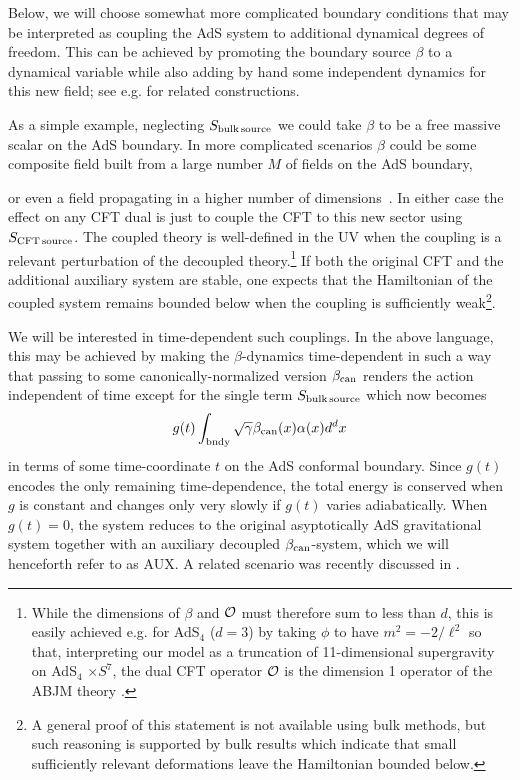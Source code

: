 \documentclass[12pt]{article}
\newcommand{\be}{\begin{equation}}
\newcommand{\ee}{\end{equation}}
\begin{document}
Below, we will choose somewhat more complicated boundary conditions that may be interpreted as coupling the AdS system to additional dynamical degrees of freedom.  This can be achieved by promoting the boundary source {$\beta$} %
to a dynamical variable while also adding by hand some independent dynamics for this new field; {see e.g.\cite{Witten:2003ya,Rocha:2008fe,Compere:2008us,Domenech:2010nf,Faulkner:2010tq,Andrade:2011dg} for related constructions}.

As a simple example, neglecting $S_{\rm bulk \,source}$ we could take $\beta$ to be a free massive scalar on the AdS boundary.  In more complicated scenarios $\beta$ could be some composite field built from a large number $M$ of fields on the AdS boundary, {or even a field propagating in a higher number of dimensions~\cite{Rocha:2008fe}.  In either case the effect on any CFT dual is just to couple the CFT to this new sector using $S_{\rm CFT \, source}$.  The coupled theory is well-defined in the UV when the coupling is a relevant perturbation of the decoupled theory.\footnote{While the dimensions of $\beta$  and ${\cal O}$ must therefore sum to less than $d$,   this is easily achieved e.g. for AdS${}_4$ ($d=3$) by taking $\phi$ to have $m^2 = -2/\ell^2$
 so that, interpreting our model as a truncation of 11-dimensional supergravity on AdS${}_4$ $\times S^7$, the dual CFT operator ${\cal O}$ is the dimension 1 operator of the ABJM theory \cite{Aharony:2008ug}.}  If both the original CFT and the additional auxiliary system are stable, one expects that the Hamiltonian of the coupled system remains bounded below when the coupling is sufficiently weak\footnote{A general proof of this statement is not available using bulk methods, but such reasoning is supported by bulk results \cite{positive} which indicate that small sufficiently relevant deformations leave the Hamiltonian bounded below.}.

We will be interested in time-dependent such couplings.  In the above language, this may be achieved by making the $\beta$-dynamics time-dependent in such a way that passing to some canonically-normalized version {$\beta_{\rm can}$} renders the action independent of time except for the single term $S_{\rm bulk \, source}$ which now becomes
\be
g(t) \int_{\rm bndy} \sqrt{\gamma} \beta_{\rm can}(x) \alpha(x) d^dx
\ee
 in terms of some time-coordinate $t$ on the AdS conformal boundary. Since $g(t)$ encodes the only remaining time-dependence, the total energy is conserved when $g$ is constant and changes only very slowly if $g(t)$ varies adiabatically.  When $g(t) =0$, the system reduces to the original asyptotically AdS gravitational system together with an auxiliary decoupled {$\beta_{\rm can}$-system}, which we will henceforth refer to as AUX. A related scenario was recently discussed in \cite{Avery:2013exa}.

}
\end{document}

